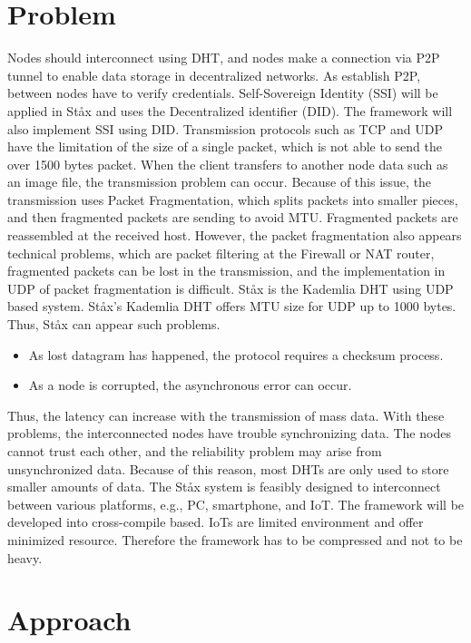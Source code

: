 \documentclass{article}
\begin{document}
\section{Problem}
Nodes should interconnect using DHT, and nodes make a connection via P2P tunnel to enable data storage in decentralized networks. As establish P2P, between nodes have to verify credentials. Self-Sovereign Identity (SSI)\cite{tobin2016inevitable} will be applied in St\aa x and uses the Decentralized identifier (DID)\cite{sabadello2018introduction}. The framework will also implement SSI using DID. Transmission protocols such as TCP and UDP have the limitation of the size of a single packet, which is not able to send the over 1500 bytes packet. When the client transfers to another node data such as an image file, the transmission problem can occur. Because of this issue, the transmission uses Packet Fragmentation, which splits packets into smaller pieces, and then fragmented packets are sending to avoid MTU. Fragmented packets are reassembled at the received host. However, the packet fragmentation also appears technical problems, which are packet filtering at the Firewall or NAT router, fragmented packets can be lost in the transmission, and the implementation in UDP of packet fragmentation is difficult. St\aa x is the Kademlia DHT using UDP based system. St\aa x's Kademlia DHT offers MTU size for UDP up to 1000 bytes. Thus, St\aa x can appear such problems.
\begin{itemize}
	\item As lost datagram has happened, the protocol requires a checksum process.
	\item As a node is corrupted, the asynchronous error can occur.
\end{itemize}
Thus, the latency can increase with the transmission of mass data. With these problems, the interconnected nodes have trouble synchronizing data. The nodes cannot trust each other, and the reliability problem may arise from unsynchronized data. Because of this reason, most DHTs are only used to store smaller amounts of data. The St\aa x system is feasibly designed to interconnect between various platforms, e.g., PC, smartphone, and IoT. The framework will be developed into cross-compile based. IoTs are limited environment and offer minimized resource. Therefore the framework has to be compressed and not to be heavy.

\section{Approach}
\end{document}
